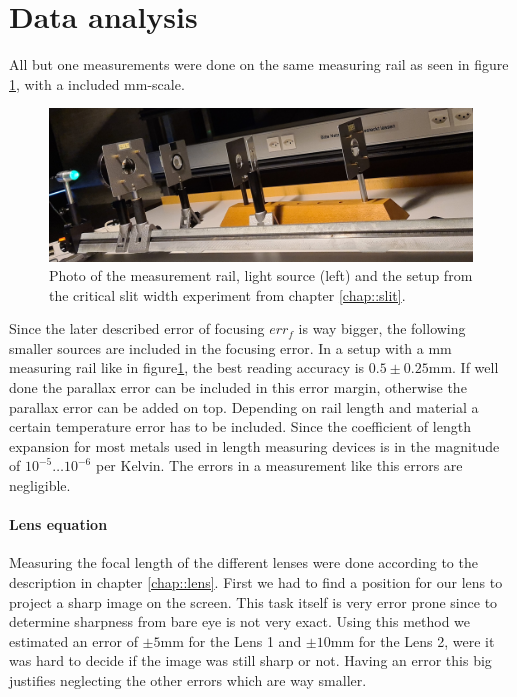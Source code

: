 \section{Data analysis}

All but one measurements were done on the same measuring rail as seen in figure \ref{fig::rail}, with a included \si{\milli \m}-scale. 
\begin{figure}[h!]
	\centering
	\includegraphics[width=\textwidth]{img/railcut.jpeg}
	\caption{Photo of the measurement rail, light source (left) and the setup from the critical slit width experiment from chapter \ref{chap::slit}.}
	\label{fig::rail}
\end{figure}

Since the later described error of focusing $err_f$ is way bigger, the following smaller sources are included in the focusing error.
In a setup with a \si{\milli \m} measuring rail like in figure\ref{fig::rail}, the best reading accuracy is $0.5 \pm 0.25$\si{\milli \m}. 
If well done the parallax error can be included in this error margin, otherwise the parallax error can be added on top.
Depending on rail length and material a certain temperature error has to be included. 
Since the coefficient of length expansion for most metals used in length measuring devices is in the magnitude of $10^{-5} \dots 10^{-6}$ per Kelvin.
The errors in a measurement like this errors are negligible. 

\paragraph{Lens equation}
Measuring the focal length of the different lenses were done according to the description in chapter \ref{chap::lens}. 
First we had to find a position for our lens to project a sharp image on the screen.
This task itself is very error prone since to determine sharpness from bare eye is not very exact.
Using this method we estimated an error of $\pm 5$\si{\milli\m} for the Lens 1 and $\pm 10$\si{\milli\m} for the Lens 2, were it was hard to decide if the image was still sharp or not.
Having an error this big justifies neglecting the other errors which are way smaller.

